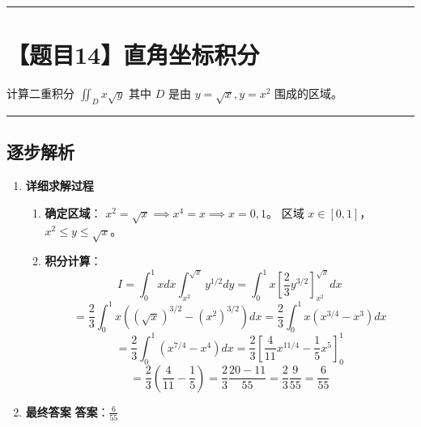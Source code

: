 \documentclass[UTF8]{ctexart}
\newenvironment{redenv}{\color{red}}{}
\newenvironment{detailedanalysis}{%
    \color{red}
    \begin{enumerate}[label=\textbf{第\arabic*步：}, leftmargin=*, align=left, itemsep=1.5ex]
}{%
    \end{enumerate}
}
\newcommand{\problemrule}{\noindent\rule{\textwidth}{1.5pt}\vspace{-0.8em}}
\newcommand{\analysisrule}{\noindent\rule{\textwidth}{0.8pt}\vspace{-0.8em}}
\begin{document}
\problemrule
\section*{【题目14】直角坐标积分}
计算二重积分 $ \iint_{D} x\sqrt{y} $ 其中 $D$ 是由 $ y = \sqrt{x}, y = x^{2} $ 围成的区域。

\begin{redenv}
\analysisrule
\subsection*{逐步解析}

\begin{detailedanalysis}
\item \textbf{详细求解过程}
\begin{enumerate}[label=(\arabic*)]
\item \textbf{确定区域}：
$x^2 = \sqrt{x} \implies x^4 = x \implies x=0, 1$。
区域 $x \in [0, 1]$，$x^2 \le y \le \sqrt{x}$。
\item \textbf{积分计算}：
$$ I = \int_0^1 x dx \int_{x^2}^{\sqrt{x}} y^{1/2} dy = \int_0^1 x [\frac{2}{3}y^{3/2}]_{x^2}^{\sqrt{x}} dx $$
$$ = \frac{2}{3} \int_0^1 x ( (\sqrt{x})^{3/2} - (x^2)^{3/2} ) dx = \frac{2}{3} \int_0^1 x (x^{3/4} - x^3) dx $$
$$ = \frac{2}{3} \int_0^1 (x^{7/4} - x^4) dx = \frac{2}{3} [\frac{4}{11}x^{11/4} - \frac{1}{5}x^5]_0^1 $$
$$ = \frac{2}{3} (\frac{4}{11} - \frac{1}{5}) = \frac{2}{3} \frac{20-11}{55} = \frac{2}{3} \frac{9}{55} = \frac{6}{55} $$
\end{enumerate}

\item \textbf{最终答案}
\textbf{答案}：$ \frac{6}{55} $
\end{detailedanalysis}
\end{redenv}
\end{document}

